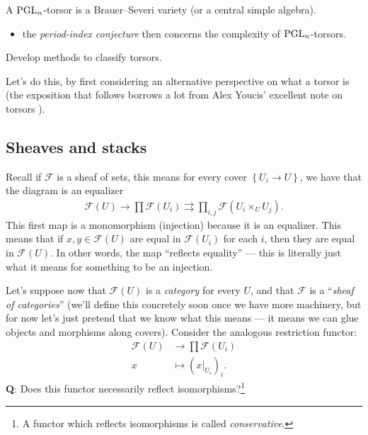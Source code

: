 \documentclass[11pt,openany]{book}
\begin{document}
\begin{example} A $\mathrm{PGL}_n$-torsor is a Brauer--Severi variety (or a central simple algebra).
\end{example}
\begin{itemize}
    \item the \textit{period-index conjecture} then concerns the complexity of $\mathrm{PGL}_n$-torsors.
\end{itemize}

\begin{goal} Develop methods to classify torsors.
\end{goal}

Let's do this, by first considering an alternative perspective on what a torsor is (the exposition that follows borrows a lot from Alex Youcis' excellent note on torsors \cite{Youcis}).

\subsection{Sheaves and stacks}

Recall if $\mathscr{F}$ is a sheaf of sets, this means for every cover $\left\{ U_i \to U \right\}$, we have that the diagram is an equalizer
\begin{align*}
    \mathcal{F}(U) \to \prod \mathcal{F}(U_i) \rightrightarrows \prod_{i,j} \mathcal{F}(U_i \times_U U_j).
\end{align*}
This first map is a monomorphism (injection) because it is an equalizer. This means that if $x,y \in \mathcal{F}(U)$ are equal in $\mathcal{F}(U_i)$ for each $i$, then they are equal in $\mathcal{F}(U)$. In other words, the map ``reflects equality'' --- this is literally just what it means for something to be an injection.

Let's suppose now that $\mathcal{F}(U)$ is a \textit{category} for every $U$, and that $\mathcal{F}$ is a ``\textit{sheaf of categories}'' (we'll define this concretely soon once we have more machinery, but for now let's just pretend that we know what this means --- it means we can glue objects and morphisms along covers). Consider the analogous restriction functor:
\begin{align*}
    \mathcal{F}(U) &\to \prod \mathcal{F}(U_i) \\
    x &\mapsto \left( x|_{U_i} \right)_i.
\end{align*}
%
\textbf{Q}: Does this functor necessarily reflect isomorphisms?\footnote{A functor which reflects isomorphisms is called \textit{conservative}.}
\end{document}
